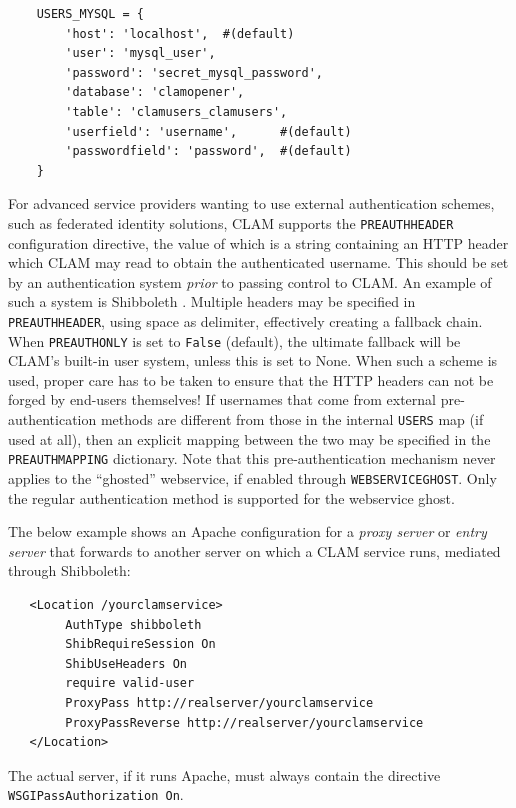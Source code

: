 \documentclass[a4paper,12pt]{report}
\begin{document}
\begin{verbatim}
    USERS_MYSQL = {
        'host': 'localhost',  #(default)
        'user': 'mysql_user',        
        'password': 'secret_mysql_password',
        'database': 'clamopener',
        'table': 'clamusers_clamusers',
        'userfield': 'username',      #(default)
        'passwordfield': 'password',  #(default)
    }
\end{verbatim}

For advanced service providers wanting to use external authentication schemes,
such as federated identity solutions, CLAM supports the \texttt{PREAUTHHEADER}
configuration directive, the value of which is a string containing an HTTP
header which CLAM may read to obtain the authenticated username. This should be
set by an authentication system \emph{prior} to passing control to CLAM. An
example of such a system is Shibboleth .
Multiple headers may be specified in \texttt{PREAUTHHEADER}, using space as
delimiter, effectively creating a fallback chain. When \texttt{PREAUTHONLY} is
set to \texttt{False} (default), the ultimate fallback will be CLAM's built-in
user system, unless this is set to None. When such a scheme is used, proper
care has to be taken to ensure that the HTTP headers can not be forged by
end-users themselves! If usernames that come from external pre-authentication
methods are different from those in the internal \texttt{USERS} map (if used at
all), then an explicit mapping between the two may be specified in the
\texttt{PREAUTHMAPPING} dictionary. Note that this pre-authentication mechanism
never applies to the ``ghosted'' webservice, if enabled through
\texttt{WEBSERVICEGHOST}. Only the regular authentication method is supported
for the webservice ghost.

The below example shows an Apache configuration for a \emph{proxy server} or
\emph{entry server} that forwards to another server on which a CLAM service runs, mediated
through Shibboleth:

\begin{verbatim}
   <Location /yourclamservice>
        AuthType shibboleth
        ShibRequireSession On
        ShibUseHeaders On
        require valid-user
        ProxyPass http://realserver/yourclamservice
        ProxyPassReverse http://realserver/yourclamservice
   </Location>
\end{verbatim}

The actual server, if it runs Apache, must always contain the directive
\texttt{WSGIPassAuthorization On}.
\end{document}
